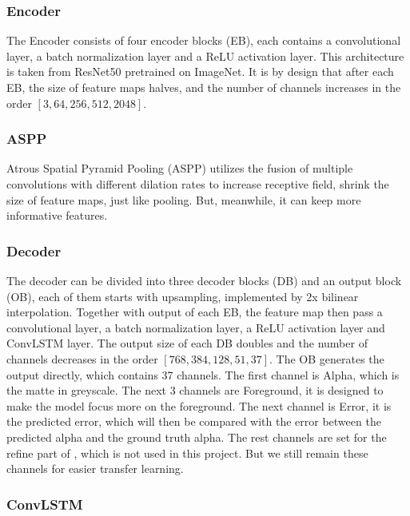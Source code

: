 \documentclass[final]{cvpr}
\begin{document}
\subsubsection{Encoder}

The Encoder consists of four encoder blocks (EB), each contains a convolutional layer, a batch normalization layer and a ReLU activation layer. This architecture is taken from ResNet50 pretrained on ImageNet. It is by design that after each EB, the size of feature maps halves, and the number of channels increases in the order $[3, 64, 256, 512, 2048]$.

\subsubsection{ASPP}

Atrous Spatial Pyramid Pooling (ASPP) utilizes the fusion of multiple convolutions with different dilation rates to increase receptive field, shrink the size of feature maps, just like pooling. But, meanwhile, it can keep more informative features.

\subsubsection{Decoder}

The decoder can be divided into three decoder blocks (DB) and an output block (OB), each of them starts with upsampling, implemented by 2x bilinear interpolation. Together with output of each EB, the feature map then pass a convolutional layer, a batch normalization layer, a ReLU activation layer and ConvLSTM layer. The output size of each DB doubles and the number of channels decreases in the order  $[768, 384, 128, 51, 37]$. The OB generates the output directly, which contains 37 channels. The first channel is Alpha, which is the matte in greyscale. The next 3 channels are Foreground, it is designed to make the model focus more on the foreground. The next channel is Error, it is the predicted error, which will then be compared with the error between the predicted alpha and the ground truth alpha. The rest channels are set for the refine part of \cite{linRealTimeHighResolutionBackground2020a}, which is not used in this project. But we still remain these channels for easier transfer learning.

\subsubsection{ConvLSTM}
\end{document}
